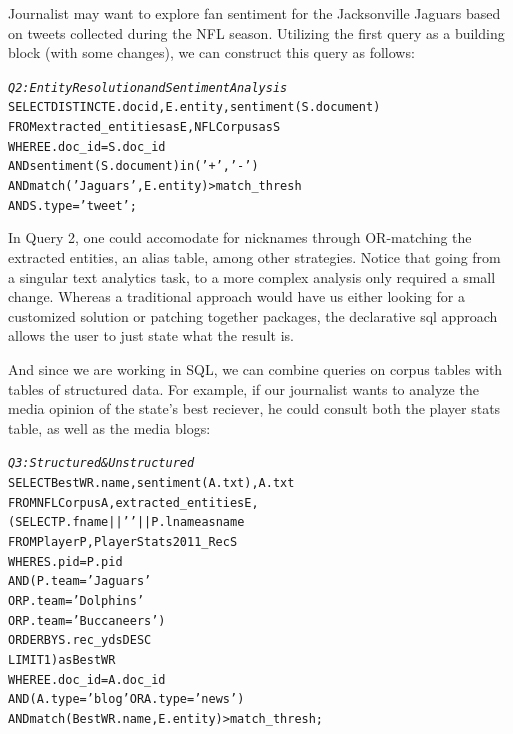 Journalist may want to explore fan sentiment for the Jacksonville Jaguars
based on tweets collected during the NFL season. Utilizing the first 
query as a building block (with some changes), we can construct this 
query as follows:

\begin{small}
\begin{alltt}
\textit{Q2: Entity Resolution and Sentiment Analysis}
SELECT DISTINCT E.docid, E.entity, sentiment(S.document)
FROM extracted_entities as E, NFLCorpus as S
WHERE E.doc_id = S.doc_id
  AND sentiment(S.document) in ('+', '-')
  AND match('Jaguars', E.entity) > match\_thresh
  AND S.type = 'tweet';
\end{alltt}
\end{small}

In Query 2, one could accomodate for nicknames through OR-matching
the extracted entities, an alias table, among other strategies. Notice
that going from a singular text analytics task, to a more 
complex analysis only required a small change. Whereas a traditional
approach would have us either looking for a customized solution or patching
together packages, the declarative sql approach allows the user to just 
state what the result is.

And since we are working in SQL, we can combine queries on corpus 
tables with tables of structured data. For example, if our journalist
wants to analyze the media opinion of the state's best reciever,
he could consult both the player stats table, as well as the media blogs:

\begin{small}
\begin{alltt}
\textit{Q3: Structured & Unstructured}
SELECT BestWR.name, sentiment(A.txt), A.txt
FROM NFLCorpus A, extracted_entities E,
         (SELECT P.fname || ' ' || P.lname as name
          FROM Player P, PlayerStats2011_Rec S
          WHERE S.pid = P.pid
            AND (   P.team = 'Jaguars' 
                 OR P.team = 'Dolphins' 
                 OR P.team = 'Buccaneers')
          ORDER BY S.rec_yds DESC
          LIMIT 1) as BestWR
WHERE E.doc_id = A.doc_id 
  AND (A.type = 'blog' OR A.type = 'news')
  AND match(BestWR.name, E.entity) > match\_thresh;
\end{alltt}
\end{small}

